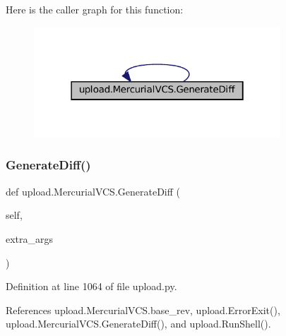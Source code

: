 Here is the caller graph for this function\+:
\nopagebreak
\begin{figure}[H]
\begin{center}
\leavevmode
\includegraphics[width=262pt]{classupload_1_1MercurialVCS_a6c05746012d8cd435c94ace1465671ef_icgraph}
\end{center}
\end{figure}
\mbox{\label{classupload_1_1MercurialVCS_a6c05746012d8cd435c94ace1465671ef}} 
\subsubsection{\texorpdfstring{Generate\+Diff()}{GenerateDiff()}\hspace{0.1cm}{\footnotesize\ttfamily [2/2]}}
{\footnotesize\ttfamily def upload.\+Mercurial\+V\+C\+S.\+Generate\+Diff (\begin{DoxyParamCaption}\item[{}]{self,  }\item[{}]{extra\+\_\+args }\end{DoxyParamCaption})}



Definition at line 1064 of file upload.\+py.



References upload.\+Mercurial\+V\+C\+S.\+base\+\_\+rev, upload.\+Error\+Exit(), upload.\+Mercurial\+V\+C\+S.\+Generate\+Diff(), and upload.\+Run\+Shell().


